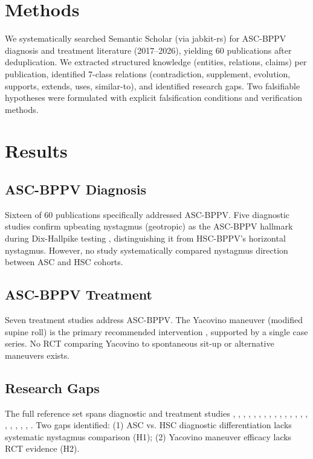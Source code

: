 \documentclass[11pt]{article}
\begin{document}
\section{Methods}
We systematically searched Semantic Scholar (via jabkit-rs) for ASC-BPPV diagnosis and treatment literature (2017--2026), yielding 60 publications after deduplication. We extracted structured knowledge (entities, relations, claims) per publication, identified 7-class relations (contradiction, supplement, evolution, supports, extends, uses, similar-to), and identified research gaps. Two falsifiable hypotheses were formulated with explicit falsification conditions and verification methods.
\section{Results}
\subsection{ASC-BPPV Diagnosis}
Sixteen of 60 publications specifically addressed ASC-BPPV. Five diagnostic studies confirm upbeating nystagmus (geotropic) as the ASC-BPPV hallmark during Dix-Hallpike testing \cite{s._alzuphar2016}\cite{g._santopietro2026}, distinguishing it from HSC-BPPV's horizontal nystagmus. However, no study systematically compared nystagmus direction between ASC and HSC cohorts.
\subsection{ASC-BPPV Treatment}
Seven treatment studies address ASC-BPPV. The Yacovino maneuver (modified supine roll) is the primary recommended intervention \cite{b._gao2007}\cite{n._si2017}, supported by a single case series. No RCT comparing Yacovino to spontaneous sit-up or alternative maneuvers exists.
\subsection{Research Gaps}
The full reference set spans diagnostic and treatment studies \cite{wang_xue_ha2014}, \cite{j._lopez_escamez2006}, \cite{s._korres2008}, \cite{f._viberti2025}, \cite{p._lorin2005}, \cite{t._chimona2013}, \cite{y._ou2015}, \cite{b._cakir2006}, \cite{andrea_castellucci2020}, \cite{y._rah2026}, \cite{rushika_patel2024}, \cite{juras_jocys2025}, \cite{a._bhandari2021}, \cite{danping_chen2015}, \cite{d._yacovino2009}, \cite{thanatporn_vongviriyangkoon2026}, \cite{b._kinne2012}, \cite{y._k._kim2005}, \cite{y._ou2015}, \cite{j._lopez_escamez2006}, \cite{f._ramos2019}. Two gaps identified: (1) ASC vs. HSC diagnostic differentiation lacks systematic nystagmus comparison (H1); (2) Yacovino maneuver efficacy lacks RCT evidence (H2).
\end{document}

